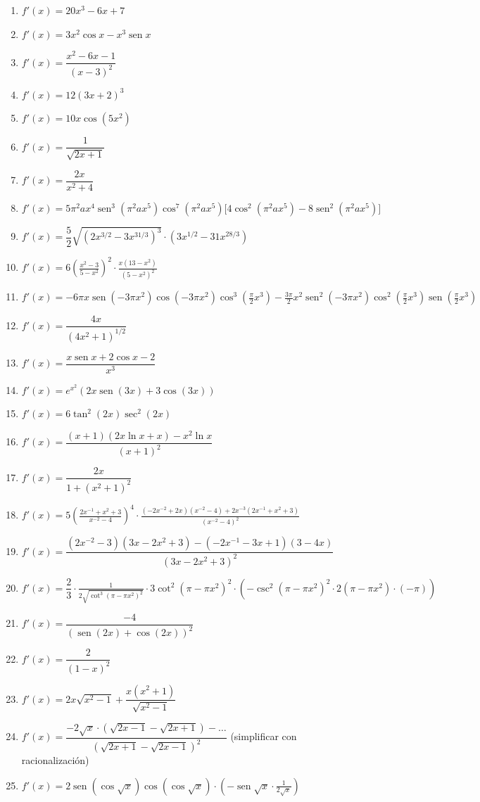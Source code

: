 \documentclass[12pt, letterpaper]{article}
\begin{document}
  \begin{enumerate}[leftmargin=*, label=\textbf{\arabic*.}]
    \item $f'(x) = 20x^3 - 6x + 7$
    \item $f'(x) = 3x^2\cos x - x^3\operatorname{sen} x$
    \item $f'(x) = \dfrac{x^2 - 6x - 1}{(x-3)^2}$
    \item $f'(x) = 12(3x+2)^3$
    \item $f'(x) = 10x\cos(5x^2)$
    \item $f'(x) = \dfrac{1}{\sqrt{2x + 1}}$
    \item $f'(x) = \dfrac{2x}{x^2 + 4}$
    \item $f'(x) = 5\pi^2 a x^4\operatorname{sen}^3(\pi^2 a x^5)\cos^7(\pi^2 a x^5)\bigl[4\cos^2(\pi^2 a x^5) - 8\operatorname{sen}^2(\pi^2 a x^5)\bigr]$
    \item $f'(x) = \dfrac{5}{2}\sqrt{\left(2x^{3/2} - 3x^{31/3}\right)^3}\cdot\left(3x^{1/2} - 31x^{28/3}\right)$
    \item $f'(x) = 6\left(\frac{x^2-3}{5-x^2}\right)^2\cdot\frac{x(13-x^2)}{(5-x^2)^2}$
    \item $f'(x) = -6\pi x\operatorname{sen}(-3\pi x^2)\cos(-3\pi x^2)\cos^3(\frac{\pi}{2}x^3) - \frac{3\pi}{2}x^2\operatorname{sen}^2(-3\pi x^2)\cos^2(\frac{\pi}{2}x^3)\operatorname{sen}(\frac{\pi}{2}x^3)$
    \item $f'(x) = \dfrac{4x}{(4x^2+1)^{1/2}}$
    \item $f'(x) = \dfrac{x\operatorname{sen} x + 2\cos x - 2}{x^3}$
    \item $f'(x) = e^{x^2}\left(2x\operatorname{sen}(3x) + 3\cos(3x)\right)$
    \item $f'(x) = 6\tan^2(2x)\sec^2(2x)$
    \item $f'(x) = \dfrac{(x+1)(2x\ln x + x) - x^2\ln x}{(x+1)^2}$
    \item $f'(x) = \dfrac{2x}{1 + (x^2+1)^2}$
    \item $f'(x) = 5\left(\frac{2x^{-1}+x^2+3}{x^{-2}-4}\right)^4\cdot\frac{(-2x^{-2}+2x)(x^{-2}-4) + 2x^{-3}(2x^{-1}+x^2+3)}{(x^{-2}-4)^2}$
    \item $f'(x) = \dfrac{(2x^{-2}-3)(3x-2x^2+3) - (-2x^{-1}-3x+1)(3-4x)}{(3x-2x^2+3)^2}$
    \item $f'(x) = \dfrac{2}{3}\cdot\frac{1}{2\sqrt{\cot^3(\pi-\pi x^2)^2}}\cdot 3\cot^2(\pi-\pi x^2)^2\cdot\left(-\csc^2(\pi-\pi x^2)^2\cdot 2(\pi-\pi x^2)\cdot(-\pi)\right)$
    \item $f'(x) = \dfrac{-4}{\left(\operatorname{sen}(2x)+\cos(2x)\right)^2}$
    \item $f'(x) = \dfrac{2}{(1-x)^2}$
    \item $f'(x) = 2x\sqrt{x^2-1} + \dfrac{x(x^2+1)}{\sqrt{x^2-1}}$
    \item $f'(x) = \dfrac{-2\sqrt{x}\cdot\left(\sqrt{2x-1} - \sqrt{2x+1}\right) - \dots}{(\sqrt{2x+1}-\sqrt{2x-1})^2}$ (simplificar con racionalización)
    \item $f'(x) = 2\operatorname{sen}(\cos\sqrt{x})\cos(\cos\sqrt{x})\cdot\left(-\operatorname{sen}\sqrt{x}\cdot\frac{1}{2\sqrt{x}}\right)$

  \end{enumerate}
\fi
\end{document}
